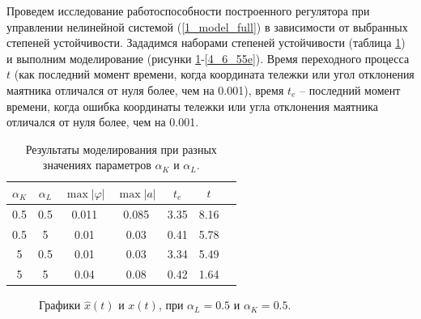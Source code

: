 \newpage
Проведем исследование работоспособности построенного регулятора при управлении нелинейной системой (\ref{1_model_full}) в зависимости от выбранных степеней устойчивости. Зададимся наборами степеней устойчивости (таблица \ref{4_tab_6}) и выполним моделирование (рисунки \ref{4_6_0.50.5x}-\ref{4_6_55e}). Время  переходного процесса $t$ (как последний момент времени, когда координата тележки или угол отклонения маятника отличался от нуля более, чем на 0.001), время $t_e$ -- последний момент времени, когда ошибка координаты тележки или угла отклонения маятника  отличался от нуля более, чем на 0.001.

\begin{table}[!h]
	\centering
	\caption{Результаты моделирования при разных значениях параметров $\alpha_K$ и $\alpha_L$.}
	\label{4_tab_6}
	\begin{tabular}{ccccccc}
		\toprule
		$\alpha_K$ & $\alpha_L$ & $\max |\varphi|$ & $\max |a|$  & $t_e$ & $t$ \\
		\midrule
		0.5  &  0.5  &  0.011  &  0.085 & 3.35 & 8.16  \\
		0.5  &  5  &  0.01  &  0.03 & 0.41 & 5.78  \\
		5 &  0.5  &  0.01  &  0.03 & 3.34 & 5.49   \\
		5  &  5  &  0.04  &  0.08 & 0.42 & 1.64 \\
		\bottomrule
	\end{tabular}
\end{table}




\begin{figure}[!h]
\caption{Графики $\hat{x}(t)$ и $x(t)$, при $\alpha_L = 0.5$ и $\alpha_K = 0.5$.}
\label{4_6_0.50.5x}
\end{figure}

